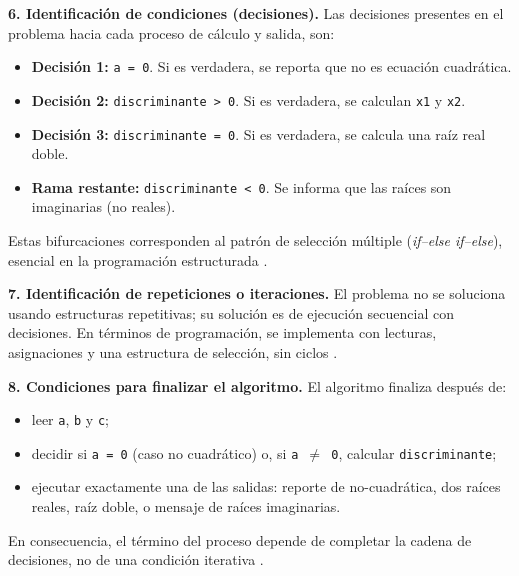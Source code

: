 \documentclass[12pt,twoside]{book}
\begin{document}
						\noindent
						\textbf{6. Identificación de condiciones (decisiones).}
						Las decisiones presentes en el problema hacia cada proceso de cálculo y salida, son:
						
						\begin{itemize}
							\item \textbf{Decisión 1:} \texttt{a = 0}. Si es verdadera, se reporta que no es ecuación cuadrática.
							\item \textbf{Decisión 2:} \texttt{discriminante > 0}. Si es verdadera, se calculan \texttt{x1} y \texttt{x2}.
							\item \textbf{Decisión 3:} \texttt{discriminante = 0}. Si es verdadera, se calcula una raíz real doble.
							\item \textbf{Rama restante:} \texttt{discriminante < 0}. Se informa que las raíces son imaginarias (no reales).
						\end{itemize}
						
						\noindent
						Estas bifurcaciones corresponden al patrón de selección múltiple (\emph{if--else if--else}), esencial en la programación estructurada \cite{Farrell2018Programming,Gaddis2022Starting}.
						
						\noindent
						\textbf{7. Identificación de repeticiones o iteraciones.}
						El problema no se soluciona usando estructuras repetitivas; su solución es de ejecución secuencial con decisiones. En términos de programación, se implementa con lecturas, asignaciones y una estructura de selección, sin ciclos \cite{Farrell2018Programming}.
						
						\noindent
						\textbf{8. Condiciones para finalizar el algoritmo.}
						El algoritmo finaliza después de:
						
						\begin{itemize}
							\item leer \texttt{a}, \texttt{b} y \texttt{c};
							\item decidir si \texttt{a = 0} (caso no cuadrático) o, si \texttt{a $\neq$ 0}, calcular \texttt{discriminante};
							\item ejecutar exactamente una de las salidas: reporte de no-cuadrática, dos raíces reales, raíz doble, o mensaje de raíces imaginarias.
						\end{itemize}
						
						\noindent
						En consecuencia, el término del proceso depende de completar la cadena de decisiones, no de una condición iterativa \cite{Gaddis2022Starting}.
				
\end{document}
